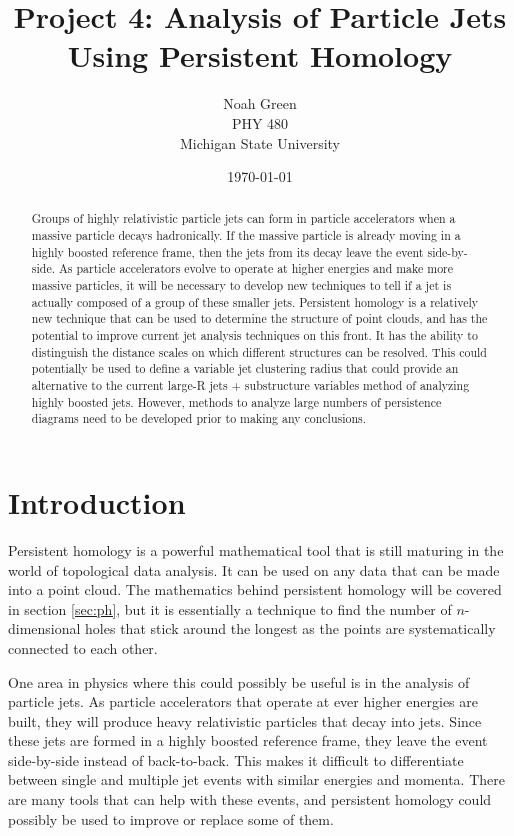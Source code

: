 \documentclass[a4paper,12pt]{report}
\begin{document}
\title{Project 4: Analysis of Particle Jets Using Persistent Homology}
\author{Noah Green \\ PHY 480 \\ Michigan State University}
\date{ \today}
\maketitle
\begin{abstract}
 Groups of highly relativistic particle jets can form in particle accelerators when a massive particle decays hadronically. If the massive particle is already moving in a highly boosted reference frame, then the jets from its decay leave the event side-by-side. As particle accelerators evolve to operate at higher energies and make more massive particles, it will be necessary to develop new techniques to tell if a jet is actually composed of a group of these smaller jets. Persistent homology is a relatively new technique that can be used to determine the structure of point clouds, and has the potential to improve current jet analysis techniques on this front. It has the ability to distinguish the distance scales on which different structures can be resolved. This could potentially be used to define a variable jet clustering radius that could provide an alternative to the current large-R jets + substructure variables method of analyzing highly boosted jets. However, methods to analyze large numbers of persistence diagrams need to be developed prior to making any conclusions.
\end{abstract}

\doublespacing
\section{Introduction}\label{sec:intro}
Persistent homology is a powerful mathematical tool that is still maturing in the world of topological data analysis. It can be used on any data that can be made into a point cloud. The mathematics behind persistent homology will be covered in section \ref{sec:ph}, but it is essentially a technique to find the number of $n$-dimensional holes that stick around the longest as the points are systematically connected to each other. 

One area in physics where this could possibly be useful is in the analysis of particle jets. As particle accelerators that operate at ever higher energies are built, they will produce heavy relativistic particles that decay into jets. Since these jets are formed in a highly boosted reference frame, they leave the event side-by-side instead of back-to-back. This makes it difficult to differentiate between single and multiple jet events with similar energies and momenta. There are many tools that can help with these events, and persistent homology could possibly be used to improve or replace some of them.
\end{document}
